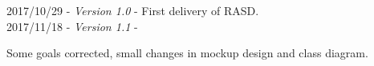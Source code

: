 2017/10/29 - \textit{Version 1.0} - {\small First delivery of RASD.} \\
2017/11/18 - \textit{Version 1.1} - \begin{small}Some goals corrected, small changes in mockup design and class diagram.\end{small}